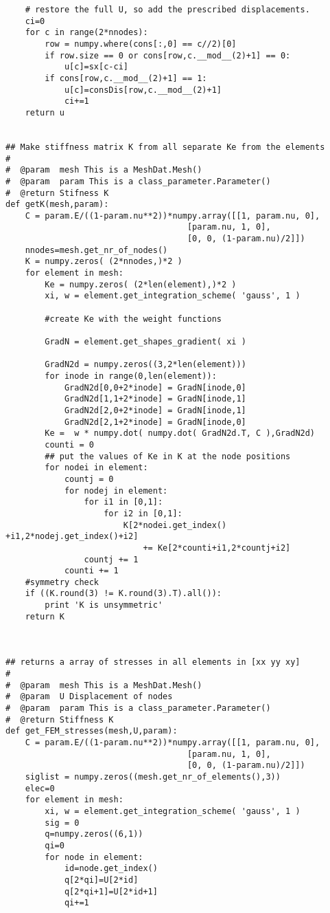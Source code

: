 \begin{appendices}
\begin{verbatim}
    # restore the full U, so add the prescribed displacements.
    ci=0
    for c in range(2*nnodes):
        row = numpy.where(cons[:,0] == c//2)[0]
        if row.size == 0 or cons[row,c.__mod__(2)+1] == 0:
            u[c]=sx[c-ci]
        if cons[row,c.__mod__(2)+1] == 1:
            u[c]=consDis[row,c.__mod__(2)+1]
            ci+=1
    return u


## Make stiffness matrix K from all separate Ke from the elements
#
#  @param  mesh This is a MeshDat.Mesh()
#  @param  param This is a class_parameter.Parameter()
#  @return Stifness K
def getK(mesh,param):
    C = param.E/((1-param.nu**2))*numpy.array([[1, param.nu, 0],
                                     [param.nu, 1, 0],
                                     [0, 0, (1-param.nu)/2]])
    nnodes=mesh.get_nr_of_nodes()
    K = numpy.zeros( (2*nnodes,)*2 )
    for element in mesh:
        Ke = numpy.zeros( (2*len(element),)*2 )
        xi, w = element.get_integration_scheme( 'gauss', 1 )

        #create Ke with the weight functions

        GradN = element.get_shapes_gradient( xi )

        GradN2d = numpy.zeros((3,2*len(element)))
        for inode in range(0,len(element)):
            GradN2d[0,0+2*inode] = GradN[inode,0]
            GradN2d[1,1+2*inode] = GradN[inode,1]
            GradN2d[2,0+2*inode] = GradN[inode,1]
            GradN2d[2,1+2*inode] = GradN[inode,0]
        Ke =  w * numpy.dot( numpy.dot( GradN2d.T, C ),GradN2d)
        counti = 0
        ## put the values of Ke in K at the node positions
        for nodei in element:
            countj = 0
            for nodej in element:
                for i1 in [0,1]:
                    for i2 in [0,1]:
                        K[2*nodei.get_index() +i1,2*nodej.get_index()+i2] 
                        	+= Ke[2*counti+i1,2*countj+i2]
                countj += 1
            counti += 1
    #symmetry check
    if ((K.round(3) != K.round(3).T).all()):
        print 'K is unsymmetric'
    return K



## returns a array of stresses in all elements in [xx yy xy]
#
#  @param  mesh This is a MeshDat.Mesh()
#  @param  U Displacement of nodes
#  @param  param This is a class_parameter.Parameter()
#  @return Stiffness K
def get_FEM_stresses(mesh,U,param):
    C = param.E/((1-param.nu**2))*numpy.array([[1, param.nu, 0],
                                     [param.nu, 1, 0],
                                     [0, 0, (1-param.nu)/2]])
    siglist = numpy.zeros((mesh.get_nr_of_elements(),3))
    elec=0
    for element in mesh:
        xi, w = element.get_integration_scheme( 'gauss', 1 )
        sig = 0
        q=numpy.zeros((6,1))
        qi=0
        for node in element:
            id=node.get_index()
            q[2*qi]=U[2*id]
            q[2*qi+1]=U[2*id+1]
            qi+=1


\end{verbatim}
\end{appendices}
